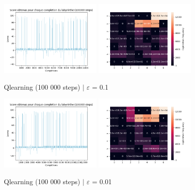 \documentclass{article}
\begin{document}
\begin{figure}[H]
    \centering
    {%
        \includegraphics[width=0.45\textwidth]{src/qlearning/greedy/greedy01.png}
    }\hfill
    {%
        \includegraphics[width=0.45\textwidth]{src/qlearning/greedy/greedy01heatmap.png}
    }
    \caption{Qlearning (100 000 steps) $|$ $\varepsilon$ = 0.1}
    \label{fig:egreedy01}
\end{figure}

\begin{figure}[H]
    \centering
    {%
        \includegraphics[width=0.45\textwidth]{src/qlearning/greedy/greedy001.png}
    }\hfill
    {%
        \includegraphics[width=0.45\textwidth]{src/qlearning/greedy/greedy001heatmap.png}
    }
    \caption{Qlearning (100 000 steps) $|$ $\varepsilon$ = 0.01}
    \label{fig:egreedy001}
\end{figure}
\end{document}
